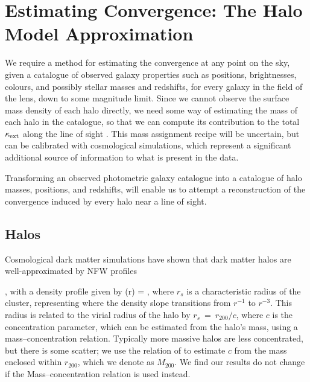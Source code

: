 \documentclass[useAMS,usenatbib]{mn2e}
\begin{document}

\section{Estimating Convergence: The Halo Model Approximation}
\label{sec:model}

We require a method for estimating the
convergence at any point on the sky, given a catalogue of observed
galaxy properties such as positions, brightnesses, colours, and
possibly stellar masses and redshifts, for every galaxy in the field of
the lens, down to some magnitude limit. Since we cannot observe the
surface mass density of each halo directly, we need some way of
estimating the mass of each halo in the catalogue, so that we can compute
its contribution to the total $\kappa_{\rm ext}$ along the line of sight \citep[as
in \eg][]{GunnarssonEtal2006,WongEtal2011,KarpenkaEtal2012}. 
This mass assignment recipe
will be uncertain, but can be calibrated with cosmological simulations, which
represent a significant additional source of information to what is present in
the data.

Transforming an observed photometric galaxy catalogue into a 
catalogue of halo masses, positions, and redshifts, will enable us to
attempt a reconstruction of the convergence induced by every halo near a
line of sight. 



\subsection{Halos}
\label{sec:model:halos}

Cosmological dark matter simulations have shown that dark matter
halos are well-approximated by NFW profiles 


\citep{NFW}, with a density
profile given by
\be\label{eq:rhonfw}
\rho(r) = 
,
\ee
where $r_{s}$ is a characteristic radius of the cluster, representing where
the density slope transitions from $r^{-1}$ to $r^{-3}$. This radius is related
to the virial radius of the halo by $r_{s}~=~r_{200}/c$, where $c$ is the concentration parameter, which can be estimated from the halo's mass,
using a mass--concentration relation. Typically more massive halos are less concentrated,
but there is some scatter; we use the relation of \citet{Neto2007} to estimate $c$
from the mass enclosed within $r_{200}$, which we denote as $M_{200}$. We find our results do not change if the \citet{MaccioEtal2008} Mass--concentration relation is used instead. 
\end{document}
